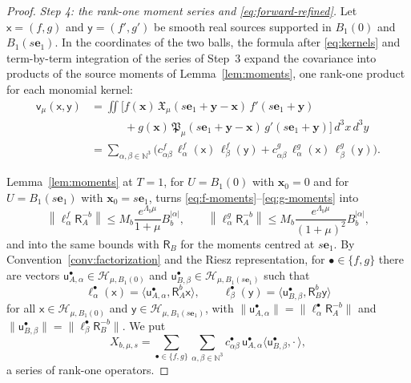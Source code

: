 \documentclass[11pt]{amsart}
\numberwithin{equation}{section}
\theoremstyle{definition}
\newcommand{\N}{\mathbb N}
\newcommand{\Hh}{\mathcal H}
\newcommand{\vv}{\mathsf v}
\newcommand{\Res}{\mathsf R}
\newcommand{\sx}{\mathsf x}
\newcommand{\sy}{\mathsf y}
\newcommand{\bx}{\mathbf x}
\newcommand{\by}{\mathbf y}
\newcommand{\eone}{\mathbf e_1}
\newcommand{\norm}[1]{\left\|#1\right\|}
\newcommand{\ip}[2]{\langle #1,#2\rangle}
\begin{document}
\begin{proof}
\smallskip
\emph{Step 4: the rank-one moment series and
\eqref{eq:forward-refined}.}
Let \(\sx=(f,g)\) and \(\sy=(f',g')\) be smooth real sources supported
in \(B_1(0)\) and \(B_1(s\eone)\). In the coordinates of the two balls,
the formula after \eqref{eq:kernels} and term-by-term integration of
the series of Step~3 expand the covariance into products of the source
moments of Lemma~\ref{lem:moments}, one rank-one product for each
monomial kernel:
\[
 \begin{split}
 \vv_\mu(\sx,\sy)
 &=\iint\bigl[f(\bx)\,\mathfrak X_\mu(s\eone+\by-\bx)\,f'(s\eone+\by)\\
 &\qquad\quad+g(\bx)\,\mathfrak P_\mu(s\eone+\by-\bx)\,g'(s\eone+\by)\bigr]
 \,d^3x\,d^3y\\
 &=\sum_{\alpha,\beta\in\N^3}
 \bigl(c^f_{\alpha\beta}\,\ell^f_\alpha(\sx)\,\ell^f_\beta(\sy)
 +c^g_{\alpha\beta}\,\ell^g_\alpha(\sx)\,\ell^g_\beta(\sy)\bigr).
 \end{split}
\]

Lemma~\ref{lem:moments} at \(T=1\), for \(U=B_1(0)\) with \(\bx_0=0\)
and for \(U=B_1(s\eone)\) with \(\bx_0=s\eone\), turns
\eqref{eq:f-moments}--\eqref{eq:g-moments} into
\[
 \norm{\ell^f_\alpha\Res_A^{-b}}
 \le M_b\frac{e^{\Lambda_b\mu}}{1+\mu}B_b^{|\alpha|},
 \qquad
 \norm{\ell^g_\alpha\Res_A^{-b}}
 \le M_b\frac{e^{\Lambda_b\mu}}{(1+\mu)^2}B_b^{|\alpha|},
\]
and into the same bounds with \(\Res_B\) for the moments centred at
\(s\eone\). By Convention~\ref{conv:factorization} and the Riesz
representation, for \(\bullet\in\{f,g\}\) there are vectors
\(\mathsf u^\bullet_{A,\alpha}\in\Hh_{\mu,B_1(0)}\) and
\(\mathsf u^\bullet_{B,\beta}\in\Hh_{\mu,B_1(s\eone)}\) such that
\[
 \ell^\bullet_\alpha(\sx)
 =\ip{\mathsf u^\bullet_{A,\alpha}}{\Res_A^b\sx},
 \qquad
 \ell^\bullet_\beta(\sy)
 =\ip{\mathsf u^\bullet_{B,\beta}}{\Res_B^b\sy}
\]
for all \(\sx\in\Hh_{\mu,B_1(0)}\) and \(\sy\in\Hh_{\mu,B_1(s\eone)}\),
with \(\lVert\mathsf u^\bullet_{A,\alpha}\rVert
=\lVert\ell^\bullet_\alpha\Res_A^{-b}\rVert\) and
\(\lVert\mathsf u^\bullet_{B,\beta}\rVert
=\lVert\ell^\bullet_\beta\Res_B^{-b}\rVert\). We put
\[
 X_{b,\mu,s}
 =\sum_{\bullet\in\{f,g\}}\sum_{\alpha,\beta\in\N^3}
 c^\bullet_{\alpha\beta}\,
 \mathsf u^\bullet_{A,\alpha}\ip{\mathsf u^\bullet_{B,\beta}}{\cdot\,},
\]
a series of rank-one operators.


\end{proof}
\end{document}
